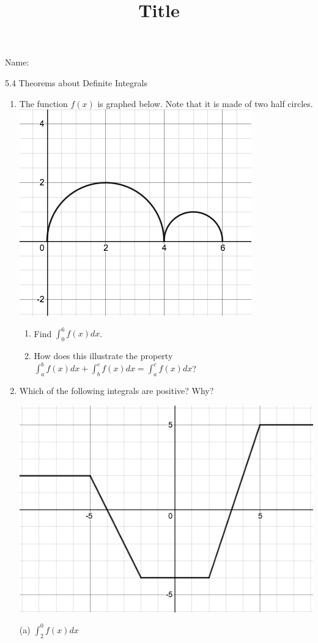 \documentclass[12pt]{article}
\title{Title}
\begin{document}
 Name:
 \begin{center}\large{5.4 Theorems about Definite Integrals}\end{center}



\begin{enumerate}
\item The function $f(x)$ is graphed below. Note that it is made of two half circles.\\
\includegraphics [scale=.4]{5_4_circ}
	\begin{enumerate}
	\item Find $\displaystyle \int_{0}^{6}f\left(x\right)dx$. 
	\item How does this illustrate the property $\displaystyle \int_{a}^{b}f\left(x\right)dx+\int_{b}^{c}f\left(x\right)dx=\int_{a}^{c}f\left(x\right)dx$?
	\end{enumerate}
\vfill
\item Which of the following integrals are positive? Why?\\

\noindent\begin{minipage}{0.3\textwidth}%
\includegraphics [scale=.4]{5_4_piece}
\end{minipage}%
\hspace{40mm}
\begin{minipage}{0.6\textwidth}
(a) $\displaystyle \int_{2}^{0}f\left(x\right)dx$\\\


\end{minipage}
\end{enumerate}
\end{document}
